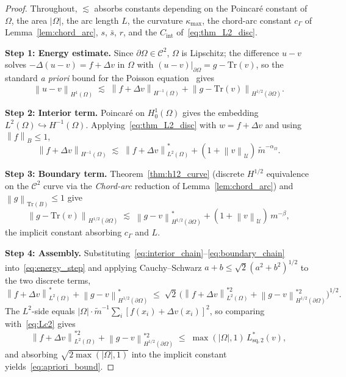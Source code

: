 \documentclass[11pt]{article}
\newcommand{\Omg}{\Omega}
\newcommand{\bOmg}{\partial\Omega}
\newcommand{\C}{\mathcal{C}}
\newcommand{\norm}[1]{\left\|#1\right\|}
\newcommand{\mtil}{\widetilde{m}}
\begin{document}
\begin{proof}
Throughout, $\lesssim$ absorbs constants depending on the Poincar\'e
constant of $\Omg$, the area $|\Omg|$, the arc length $L$, the
curvature $\kappa_{\max}$, the chord-arc constant $c_\Gamma$ of
Lemma~\ref{lem:chord_arc}, $s$, $\bar{s}$, $r$, and the
$C_{\mathrm{int}}$ of~\eqref{eq:thm_L2_disc}.
 
\medskip\noindent\textbf{Step 1: Energy estimate.}
Since $\bOmg \in \C^2$, $\Omg$ is Lipschitz; the difference $u-v$
solves $-\Delta(u-v) = f + \Delta v$ in $\Omg$ with
$(u-v)|_{\bOmg} = g - \mathrm{Tr}(v)$, so the standard
\emph{a priori} bound for the Poisson
equation~\cite[Eq.~(1.4)]{bonito2025} gives
\begin{equation}\label{eq:energy_step}
  \norm{u-v}_{H^1(\Omg)}
  \;\lesssim\; \norm{f+\Delta v}_{H^{-1}(\Omg)}
   + \norm{g-\mathrm{Tr}(v)}_{H^{1/2}(\bOmg)}.
\end{equation}
 
\medskip\noindent\textbf{Step 2: Interior term.}
Poincar\'e on $H^1_0(\Omg)$ gives the embedding
$L^2(\Omg)\hookrightarrow H^{-1}(\Omg)$. Applying~\eqref{eq:thm_L2_disc}
with $w = f + \Delta v$ and using $\norm{f}_B \le 1$,
\begin{equation}\label{eq:interior_chain}
  \norm{f+\Delta v}_{H^{-1}(\Omg)}
  \;\lesssim\; \norm{f+\Delta v}^*_{L^2(\Omg)}
   + (1+\norm{v}_{\mathcal{U}})\,\mtil^{-\alpha_\Omega}.
\end{equation}
 
\medskip\noindent\textbf{Step 3: Boundary term.}
Theorem~\ref{thm:h12_curve} (discrete $H^{1/2}$ equivalence on the
$\C^2$ curve via the \textit{Chord-arc} reduction of
Lemma~\ref{lem:chord_arc}) and $\norm{g}_{\mathrm{Tr}(B)} \le 1$ give
\begin{equation}\label{eq:boundary_chain}
  \norm{g-\mathrm{Tr}(v)}_{H^{1/2}(\bOmg)}
  \;\lesssim\; \norm{g-v}^*_{H^{1/2}(\bOmg)}
   + (1+\norm{v}_{\mathcal{U}})\,m^{-\beta},
\end{equation}
the implicit constant absorbing $c_\Gamma$ and $L$.
 
\medskip\noindent\textbf{Step 4: Assembly.}
Substituting~\eqref{eq:interior_chain}--\eqref{eq:boundary_chain}
into~\eqref{eq:energy_step} and applying Cauchy--Schwarz $a + b \le
\sqrt{2}(a^2+b^2)^{1/2}$ to the two discrete terms,
\[
  \norm{f+\Delta v}^*_{L^2(\Omg)}
  + \norm{g-v}^*_{H^{1/2}(\bOmg)}
  \;\le\; \sqrt{2}\,\bigl(\norm{f+\Delta v}^{*2}_{L^2(\Omg)}
    + \norm{g-v}^{*2}_{H^{1/2}(\bOmg)}\bigr)^{1/2}.
\]
The $L^2$-side equals
$|\Omg|\cdot\mtil^{-1}\sum_i[f(x_i)+\Delta v(x_i)]^2$, so
comparing with~\eqref{eq:Lc2} gives
\[
  \norm{f+\Delta v}^{*2}_{L^2(\Omg)}
  + \norm{g-v}^{*2}_{H^{1/2}(\bOmg)}
  \;\le\; \max(|\Omg|,1)\,L^*_{\mathrm{sq},2}(v),
\]
and absorbing $\sqrt{2\max(|\Omg|,1)}$ into the implicit constant
yields~\eqref{eq:apriori_bound}.
\end{proof}
 
\end{document}
